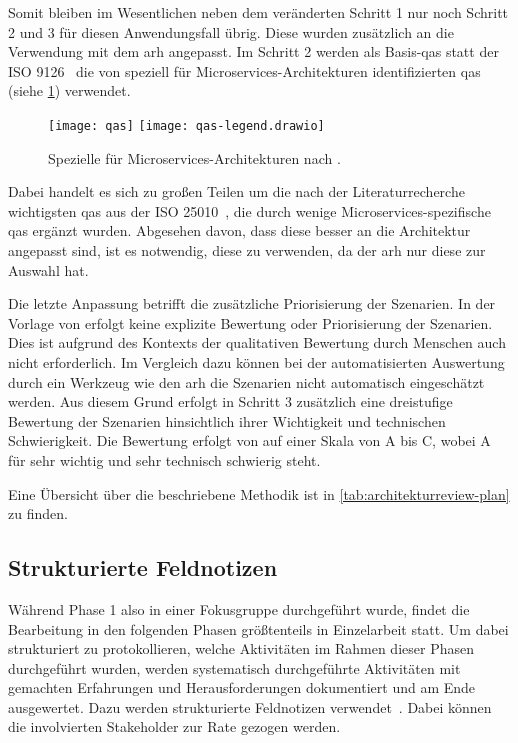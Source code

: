 Somit bleiben im Wesentlichen neben dem veränderten Schritt 1 nur noch Schritt 2 und 3 für diesen Anwendungsfall übrig.
Diese wurden zusätzlich an die Verwendung mit dem \gls{arh} angepasst.
Im Schritt 2 werden als Basis-\glspl{qa} statt der ISO 9126~\cite{ISO-9126} die von  speziell für Microservices-Architekturen identifizierten \glspl{qa} (siehe \cref{fig:qas}) verwendet.
\begin{figure}[!h]
	\centering
	\texttt{[image: qas]}
	\texttt{[image: qas-legend.drawio]}
	\caption[Spezielle  für Microservices-Architekturen]{
		Spezielle  für Microservices-Architekturen nach .
	}
	\label{fig:qas}
\end{figure}
Dabei handelt es sich zu großen Teilen um die nach der Literaturrecherche wichtigsten \glspl{qa} aus der ISO 25010~\cite{ISO-25010}, die durch wenige Microservices-spezifische \glspl{qa} ergänzt wurden.
Abgesehen davon, dass diese besser an die Architektur angepasst sind, ist es notwendig, diese zu verwenden, da der \gls{arh} nur diese zur Auswahl hat.

Die letzte Anpassung betrifft die zusätzliche Priorisierung der Szenarien.
In der Vorlage von  erfolgt keine explizite Bewertung oder Priorisierung der Szenarien.
Dies ist aufgrund des Kontexts der qualitativen Bewertung durch Menschen auch nicht erforderlich.
Im Vergleich dazu können bei der automatisierten Auswertung durch ein Werkzeug wie den \gls{arh} die Szenarien nicht automatisch eingeschätzt werden.
Aus diesem Grund erfolgt in Schritt 3 zusätzlich eine dreistufige Bewertung der Szenarien hinsichtlich ihrer Wichtigkeit und technischen Schwierigkeit.
Die Bewertung erfolgt von auf einer Skala von A bis C, wobei A für sehr wichtig und sehr technisch schwierig steht.

Eine Übersicht über die beschriebene Methodik ist in \cref{tab:architekturreview-plan} zu finden.



\subsection{Strukturierte Feldnotizen}
\label{sec:structured-field-notes}

Während Phase 1 also in einer Fokusgruppe durchgeführt wurde, findet die Bearbeitung in den folgenden Phasen größtenteils in Einzelarbeit statt.
Um dabei strukturiert zu protokollieren, welche Aktivitäten im Rahmen dieser Phasen durchgeführt wurden, werden systematisch durchgeführte Aktivitäten mit gemachten Erfahrungen und Herausforderungen dokumentiert und am Ende ausgewertet.
Dazu werden strukturierte Feldnotizen verwendet~\cite{seaman2008qualitative}.
Dabei können die involvierten Stakeholder zur Rate gezogen werden.


